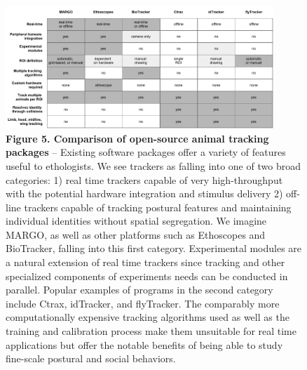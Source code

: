 \documentclass[10pt]{article}
\begin{document}
\newpage
\begin{figure}[t!]
	\begin{center}
		\vspace*{-8cm}
		\includegraphics[width=0.9\textwidth]{../figures/platform_comparison_table.pdf}
	\end{center}
	\caption*{\footnotesize \textbf{Figure 5. Comparison of open-source animal tracking packages} -- Existing software packages offer a variety of features useful to ethologists. We see trackers as falling into one of two broad categories: 1) real time trackers capable of very high-throughput with the potential hardware integration and stimulus delivery 2) off-line trackers capable of tracking postural features and maintaining individual identities without spatial segregation. We imagine MARGO, as well as other platforms such as Ethoscopes and BioTracker, falling into this first category. Experimental modules are a natural extension of real time trackers since tracking and other specialized components of experiments needs can be conducted in parallel. Popular examples of programs in the second category include Ctrax, idTracker, and flyTracker. The comparably more computationally expensive tracking algorithms used as well as the training and calibration process make them unsuitable for real time applications but offer the notable benefits of being able to study fine-scale postural and social behaviors.}
\end{figure}
\end{document}
